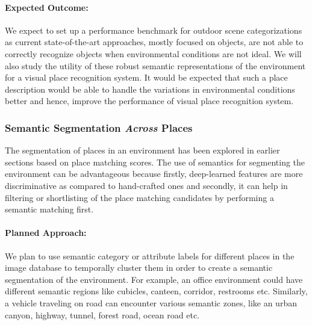 \documentclass{article}
\begin{document}
\paragraph{Expected Outcome:}
We expect to set up a performance benchmark for outdoor scene categorizations as current state-of-the-art approaches, mostly focused on objects, are not able to correctly recognize objects when environmental conditions are not ideal. We will also study the utility of these robust semantic representations of the environment for a visual place recognition system. It would be expected that such a place description would be able to handle the variations in environmental conditions better and hence, improve the performance of visual place recognition system.

\subsubsection{Semantic Segmentation \emph{Across} Places}
The segmentation of places in an environment has been explored in earlier sections based on place matching scores. The use of semantics for segmenting the environment can be advantageous because firstly, deep-learned features are more discriminative \cite{chen2017deep} as compared to hand-crafted ones and secondly, it can help in filtering or shortlisting of the place matching candidates by performing a semantic matching first.

\paragraph{Planned Approach:}
We plan to use semantic category or attribute labels for different places in the image database to temporally cluster them in order to create a semantic segmentation of the environment. For example, an office environment could have different semantic regions like cubicles, canteen, corridor, restrooms etc. Similarly, a vehicle traveling on road can encounter various semantic zones, like an urban canyon, highway, tunnel, forest road, ocean road etc.
\end{document}
